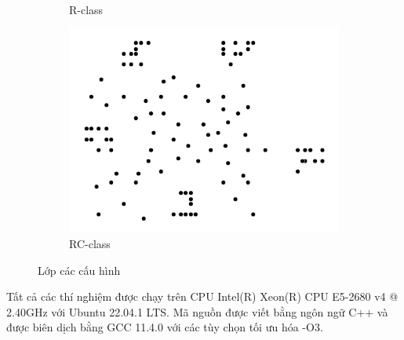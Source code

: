 \begin{figure}[H]
\begin{subfigure}{.3\textwidth}
    \caption{R-class}
    \label{fig:cls_r}
  \end{subfigure}
  \begin{subfigure}{.3\textwidth}
    \centering
    \includegraphics[width=1\linewidth]{figures/cls_rc.png}
    \caption{RC-class}
    \label{fig:cls_rc}
  \end{subfigure}
  \caption{Lớp các cấu hình}
\end{figure}

Tất cả các thí nghiệm được chạy trên CPU Intel(R) Xeon(R) CPU E5-2680 v4 @ 2.40GHz với Ubuntu 22.04.1 LTS. Mã nguồn được viết bằng ngôn ngữ C++ và được biên dịch bằng GCC 11.4.0 với các tùy chọn tối ưu hóa -O3.


